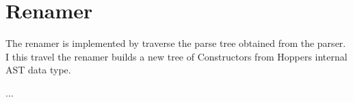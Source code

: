 \section{Renamer}


The renamer is implemented by traverse the parse tree obtained from the parser.
I this travel the renamer builds a new tree of Constructors from Hoppers 
internal AST data type.

...



